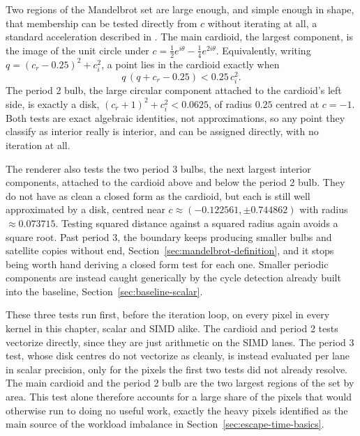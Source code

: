 \documentclass{ftndiplomski}
\begin{document}
Two regions of the Mandelbrot set are large enough, and simple enough in shape, that membership can
be tested directly from $c$ without iterating at all, a standard acceleration described in
\cite{peitgensaupe1988}. The main cardioid, the largest component, is
the image of the unit circle under $c = \tfrac{1}{2}e^{i\theta} - \tfrac{1}{4}e^{2i\theta}$.
Equivalently, writing $q = (c_r - 0.25)^2 + c_i^2$, a point lies in the cardioid exactly when
\begin{equation}
  \label{eq:cardioid-test}
  q \, (q + c_r - 0.25) < 0.25 \, c_i^2 .
\end{equation}
The period 2 bulb, the large circular component attached to the cardioid's left side, is exactly a
disk, $(c_r + 1)^2 + c_i^2 < 0.0625$, of radius $0.25$ centred at $c = -1$. Both tests are exact
algebraic identities, not approximations, so any point they classify as interior really is
interior, and can be assigned  directly, with no iteration at all.

The renderer also tests the two period 3 bulbs, the next largest interior components, attached to
the cardioid above and below the period 2 bulb. They do not have as clean a closed form as the
cardioid, but each is still well approximated by a disk, centred near $c \approx (-0.122561,
\pm0.744862)$ with radius $\approx 0.073715$. Testing squared distance against a squared radius
again avoids a square root. Past period $3$, the boundary keeps producing smaller bulbs and
satellite copies without end, Section~\ref{sec:mandelbrot-definition}, and it stops being worth
hand deriving a closed form test for each one. Smaller periodic components are instead caught
generically by the cycle detection already built into the baseline, Section~\ref{sec:baseline-scalar}.

These three tests run first, before the iteration loop, on every pixel in every kernel in this
chapter, scalar and SIMD alike. The cardioid and period 2 tests vectorize directly, since they are
just arithmetic on the SIMD lanes. The period 3 test, whose disk centres do not vectorize as
cleanly, is instead evaluated per lane in scalar precision, only for the pixels the first two tests
did not already resolve. The main cardioid and the period 2 bulb are the two largest regions of the
set by area. This test alone therefore accounts for a large share of the pixels that would
otherwise run to  doing no useful work, exactly the heavy pixels identified as the
main source of the workload imbalance in Section~\ref{sec:escape-time-basics}.
\end{document}
